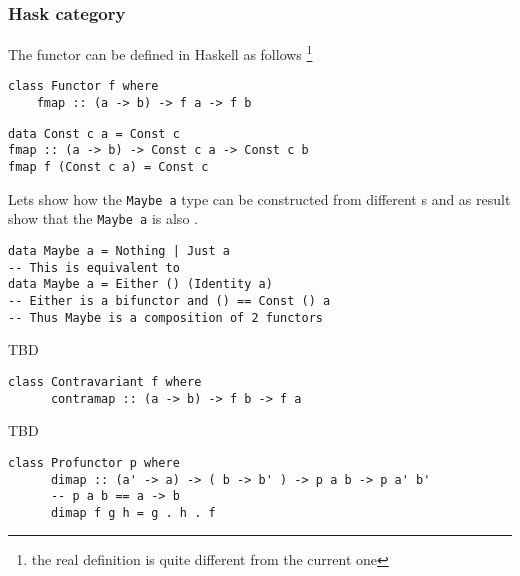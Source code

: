 \subsubsection{\textbf{Hask} category}
The functor can be defined in Haskell as follows
\footnote{the real definition is quite different from the current one}
\begin{example}
\label{ex:functor_haskell}
\begin{verbatim}
class Functor f where
    fmap :: (a -> b) -> f a -> f b
\end{verbatim} 
\end{example}


\begin{example}
\label{ex:terminal_object_cat_hask}
\begin{verbatim}
data Const c a = Const c
fmap :: (a -> b) -> Const c a -> Const c b
fmap f (Const c a) = Const c
\end{verbatim}
\end{example}

\begin{example}
\label{ex:maybe_functor}
Lets show how the \texttt{Maybe a} type can be
constructed from different 
s and as result show that the
\texttt{Maybe a} is also 
. 
\begin{verbatim}
data Maybe a = Nothing | Just a
-- This is equivalent to
data Maybe a = Either () (Identity a)
-- Either is a bifunctor and () == Const () a 
-- Thus Maybe is a composition of 2 functors 
\end{verbatim}
\end{example}

\begin{example}
\label{ex:contravariant_functor_hask}
TBD
\begin{verbatim}
class Contravariant f where
      contramap :: (a -> b) -> f b -> f a
\end{verbatim}
\end{example}

\begin{example}
\label{ex:contravariant_functor_hask}
TBD
\begin{verbatim}
class Profunctor p where
      dimap :: (a' -> a) -> ( b -> b' ) -> p a b -> p a' b'
      -- p a b == a -> b
      dimap f g h = g . h . f
\end{verbatim}
\end{example}


